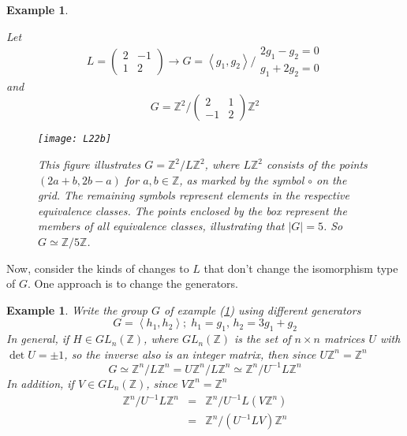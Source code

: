 \documentclass[11pt,english]{article}
\newtheorem{example}[theorem]{Example}
\newcommand{\Z}{\mathbb Z}  %
\begin{document}
\begin{example}\label{ex:group}

Let\[
L=\left(\begin{array}{cc}
2 & -1\\
1 & 2\end{array}\right)\rightarrow G=\left\langle g_{1},g_{2}\right\rangle /\begin{array}{c}
2g_{1}-g_{2}=0\\
g_{1}+2g_{2}=0\end{array}\]
and\[
G=\mathbb{Z}^{2}/\left(\begin{array}{cc}
2 & 1\\
-1 & 2\end{array}\right)\mathbb{Z}^{2}\]


%
\begin{figure}[H]
\begin{centering}
\texttt{[image: L22b]}
\par\end{centering}

\caption{{\footnotesize This figure illustrates $G = \Z^2 / L\Z^2$, where $L\Z^2$ consists
of the points $\left(2a+b,2b-a\right)$ for $a,b\in\mathbb{Z}$, as
marked by the symbol $\circ$ on the grid. The remaining symbols represent
elements in the respective equivalence classes.  The points enclosed
by the box represent the members of all equivalence classes, illustrating
that $\left|G\right|=5$.  So $G \simeq \Z/5\Z$.}}

\end{figure}


\end{example}

Now, consider the kinds of changes to $L$ that don't change the isomorphism
type of $G$. One approach is to change the generators.

\begin{example}

Write the group $G$ of example (\ref{ex:group}) using different
generators\[
G=\left\langle h_{1},h_{2}\right\rangle ;\; h_{1}=g_{1},\, h_{2}=3g_{1}+g_{2}\]
In general, if $H\in GL_{n}\mathbb{\left(Z\right)}$, where $GL_{n}\mathbb{\left(Z\right)}$
is the set of $n\times n$ matrices $U$ with $\det U=\pm1$, so the
inverse also is an integer matrix, then since $U\mathbb{Z}^{n}=\mathbb{Z}^{n}$\[
G\simeq\mathbb{Z}^{n}/L\mathbb{Z}^{n}=U\mathbb{Z}^{n}/L\mathbb{Z}^{n}\simeq\mathbb{Z}^{n}/U^{-1}L\mathbb{Z}^{n}\]
In addition, if $V\in GL_{n}\left(\mathbb{Z}\right)$, since $V\mathbb{Z}^{n}=\mathbb{Z}^{n}$\begin{eqnarray*}
\mathbb{Z}^{n}/U^{-1}L\mathbb{Z}^{n} & = & \mathbb{Z}^{n}/U^{-1}L\left(V\mathbb{Z}^{n}\right)\\
 & = & \mathbb{Z}^{n}/\left(U^{-1}LV\right)\mathbb{Z}^{n}\end{eqnarray*}


\end{example}
\end{document}
